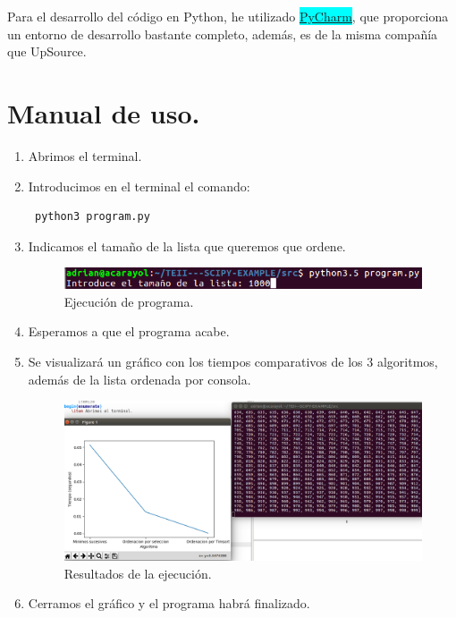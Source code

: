 \documentclass[a4,12pt]{article}
\begin{document}
	Para el desarrollo del código en Python, he utilizado \href{https://www.jetbrains.com/pycharm/}{\colorbox{cyan}{PyCharm}}, que proporciona un entorno de desarrollo bastante completo, además, es de la misma compañía que UpSource.
	\section{Manual de uso.}
	
	
	\begin{enumerate}
		\item Abrimos el terminal.
		
		\item Introducimos en el terminal el comando:
			\subitem \begin{verbatim} python3 program.py \end{verbatim}
		\item Indicamos el tamaño de la lista que queremos que ordene.
		\begin{figure}[t]
			\begin{center}
				\includegraphics[scale=0.5]{pic1.png}
				\caption{Ejecución de programa.}
			\end{center}
		\end{figure}
		\FloatBarrier
		\item Esperamos a que el programa acabe.
		\item Se visualizará un gráfico con los tiempos comparativos de los 3 algoritmos, además de la lista ordenada por consola.
		\begin{figure}[t]
			\begin{center}
				\includegraphics[scale=0.5]{pic2.png}
				\caption{Resultados de la ejecución.}
			\end{center}
		\end{figure}
		\FloatBarrier
		\item Cerramos el gráfico y el programa habrá finalizado.
	\end{enumerate}
	
\end{document}
